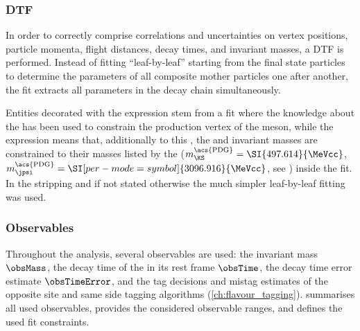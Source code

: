 \subsubsection{\Acl*{DTF}}
\label{sec:measurement_of_sin2beta:data_preparation:dtf}

In order to correctly comprise correlations and uncertainties on vertex
positions, particle momenta, flight distances, decay times, and invariant
masses, a \acf{DTF} \cite{Hulsbergen:2005pu} is performed. Instead of fitting
\enquote{leaf-by-leaf} starting from the final state particles to determine the
parameters of all composite mother particles one after another, the \DTF fit
extracts all parameters in the decay chain simultaneously.

Entities decorated with the expression \dtfpv stem from a \DTF fit where the
knowledge about the \PV has been used to constrain the production vertex of the
\Bd meson, while the expression \dtf means that, additionally to this \PV, the
\jpsi and \KS invariant masses are constrained to their masses listed by the
\PDG ($m_{\KS}^{\text{\acs{PDG}}}=\SI{497.614}{\MeVcc}$,
$m_{\jpsi}^{\text{\acs{PDG}}} = \SI[per-mode=symbol]{3096.916}{\MeVcc}$, see
\cite{Agashe:2014kda}) inside the \DTF fit. In the stripping and if not stated
otherwise the much simpler leaf-by-leaf fitting was used.

\subsubsection{Observables}
\label{sec:measurement_of_sin2beta:data_preparation:observables}

Throughout the analysis, several observables are used: the \Bd invariant mass
$\obsMass$, the decay time of the \Bd in its rest frame $\obsTime$, the \Bd
decay time error estimate $\obsTimeError$, and the tag decisions
\obsTagOSSS and mistag estimates \obsEtaOSSS of the opposite site and same side
tagging algorithms (\cf \cref{ch:flavour_tagging}).
 summarises all
used observables, provides the considered observable ranges, and defines the
used fit constraints.

